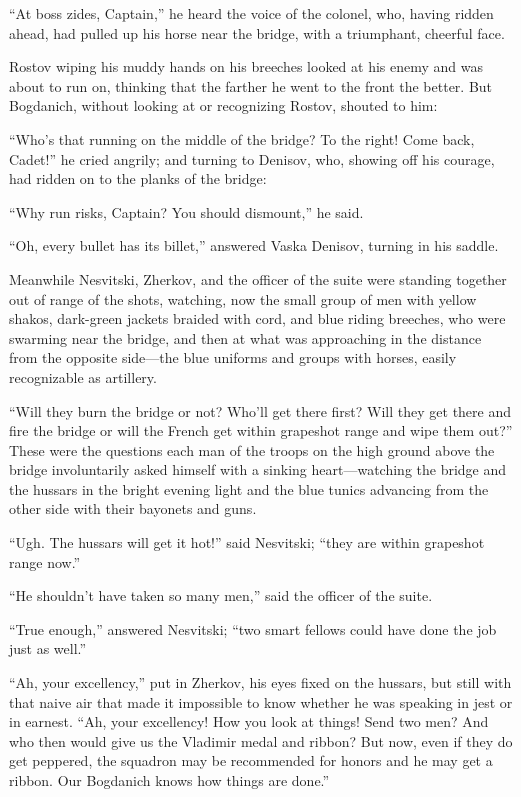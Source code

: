 ``At boss zides, Captain,'' he heard the voice of the colonel,
who, having ridden ahead, had pulled up his horse near the
bridge, with a triumphant, cheerful face.

Rostov wiping his muddy hands on his breeches looked at his enemy
and was about to run on, thinking that the farther he went to the
front the better. But Bogdanich, without looking at or
recognizing Rostov, shouted to him:

``Who's that running on the middle of the bridge? To the right!
Come back, Cadet!'' he cried angrily; and turning to Denisov,
who, showing off his courage, had ridden on to the planks of the
bridge:

``Why run risks, Captain? You should dismount,'' he said.

``Oh, every bullet has its billet,'' answered Vaska Denisov,
turning in his saddle.

Meanwhile Nesvitski, Zherkov, and the officer of the suite were
standing together out of range of the shots, watching, now the
small group of men with yellow shakos, dark-green jackets braided
with cord, and blue riding breeches, who were swarming near the
bridge, and then at what was approaching in the distance from the
opposite side---the blue uniforms and groups with horses, easily
recognizable as artillery.

``Will they burn the bridge or not? Who'll get there first? Will
they get there and fire the bridge or will the French get within
grapeshot range and wipe them out?'' These were the questions
each man of the troops on the high ground above the bridge
involuntarily asked himself with a sinking heart---watching the
bridge and the hussars in the bright evening light and the blue
tunics advancing from the other side with their bayonets and
guns.

``Ugh. The hussars will get it hot!'' said Nesvitski; ``they are
within grapeshot range now.''

``He shouldn't have taken so many men,'' said the officer of the
suite.

``True enough,'' answered Nesvitski; ``two smart fellows could
have done the job just as well.''

``Ah, your excellency,'' put in Zherkov, his eyes fixed on the
hussars, but still with that naive air that made it impossible to
know whether he was speaking in jest or in earnest. ``Ah, your
excellency! How you look at things! Send two men? And who then
would give us the Vladimir medal and ribbon? But now, even if
they do get peppered, the squadron may be recommended for honors
and he may get a ribbon. Our Bogdanich knows how things are
done.''

